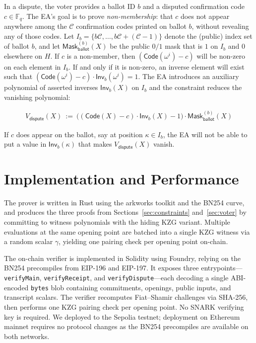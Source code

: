 In a dispute, the voter provides a ballot ID $b$ and a disputed confirmation code $c\in\mathbb{F}_q$. The EA’s goal is to prove \emph{non-membership}: that $c$ does not appear anywhere among the $\mathcal{C}$ confirmation codes printed on ballot $b$, without revealing any of those codes. Let $I_b=\{b\mathcal{C},\ldots,b\mathcal{C}+(\mathcal{C}-1)\}$ denote the (public) index set of ballot $b$, and let $\mathsf{Mask}^{(b)}_{\mathsf{ballot}}(X)$ be the public $0/1$ mask that is $1$ on $I_b$ and $0$ elsewhere on $H$. If $c$ is a non-member, then $(\mathsf{Code}(\omega^i)-c)$ will be non-zero on each element in $I_b$. If and only if it is non-zero, an inverse element will exist such that $(\mathsf{Code}(\omega^i)-c) \cdot \mathsf{Inv}_b(\omega^i)=1$. The EA introduces an auxiliary polynomial of asserted inverses $\mathsf{Inv}_b(X)$ on $I_b$ and the constraint reduces the vanishing polynomial:

\begin{mdframed}[linewidth=0.6pt,backgroundcolor=verylightpink,innerleftmargin=6pt,innerrightmargin=6pt,innertopmargin=4pt,innerbottommargin=4pt]
\[
\begin{aligned}
V_{\mathsf{dispute}}(X)\ :=\ \bigl((\mathsf{Code}(X)-c)\cdot \mathsf{Inv}_b(X)-1\bigr)\cdot \mathsf{Mask}^{(b)}_{\mathsf{ballot}}(X)
\end{aligned}
\]
\end{mdframed}

 If $c$ does appear on the ballot, say at position $\kappa\in I_b$, the EA will not be able to put a value in $\mathsf{Inv}_b(\kappa)$ that makes $V_{\mathsf{dispute}}(X)$ vanish.




\section{Implementation and Performance}

The prover is written in Rust using the arkworks toolkit and the BN254 curve, and produces the three proofs from Sections~\ref{sec:constraints} and~\ref{sec:voter} by committing to witness polynomials with the hiding KZG variant. Multiple evaluations at the same opening point are batched into a single KZG witness via a random scalar $\gamma$, yielding one pairing check per opening point on-chain.

The on-chain verifier is implemented in Solidity using Foundry, relying on the BN254 precompiles from EIP-196 and EIP-197. It exposes three entrypoints---\texttt{verifyMain},
\texttt{verifyReceipt}, and \texttt{verifyDispute}---each decoding a single ABI-encoded \texttt{bytes} blob containing commitments, openings, public inputs, and transcript scalars. The verifier recomputes Fiat--Shamir challenges via SHA-256, then performs one KZG pairing check per opening point. No SNARK verifying key is required. We deployed to the Sepolia testnet; deployment on Ethereum mainnet requires no protocol changes as the BN254 precompiles are available on both networks.

